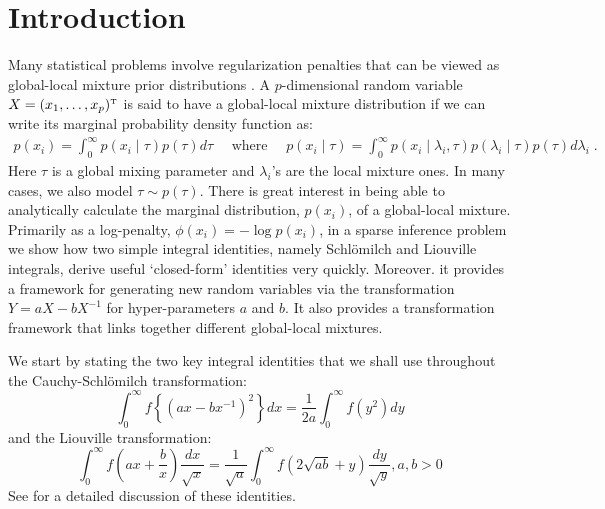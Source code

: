 \documentclass[letterpaper,11pt]{article}
\begin{document}
\section{Introduction}
Many statistical problems involve regularization penalties that can be viewed as global-local mixture prior distributions \citep{polson2011data, hans2011comment}. A $p$-dimensional random variable $X = (x_1, \ldots, x_p)^{{ \mathrm{\scriptscriptstyle T} }}$ is said to have a global-local mixture distribution if we can write its marginal probability density function as: 
\begin{gather*}
p(x_i) = \int_{0}^{\infty} p(x_i \mid \tau) p(\tau) d\tau \quad \text{ where } \quad
p( x_i \mid \tau) = \int_{0}^{\infty} p(x_i \mid \lambda_i, \tau) p(\lambda_i \mid \tau) p(\tau) d\lambda_i
\;.
\end{gather*}
Here $\tau$ is a global mixing parameter and $\lambda_i$'s are the local mixture ones. In many cases, we also model $\tau \sim p(\tau)$. There is great interest in being able to analytically calculate the marginal distribution, $p(x_i)$, of a global-local mixture. Primarily as a log-penalty, $\phi(x_i) = -\log p(x_i)$, in a sparse inference problem we show how two simple integral identities, namely Schl\"omilch and Liouville integrals, derive useful `closed-form' identities very quickly. Moreover. it provides a framework for generating new random variables via the transformation $Y = a X - b X^{-1}$ for hyper-parameters $a$ and $b$. It also provides a transformation framework that links together different global-local mixtures. 

We start by stating the two key integral identities that we shall use throughout the Cauchy-Schl\"omilch transformation: 
\begin{equation}
\int_0^\infty f \left\{ ( a x - b x^{-1} )^2 \right\} d x = \frac{1}{2a} \int_0^\infty f(y^2) d y \label{eq:identity}
\end{equation}
and the Liouville transformation:
\begin{equation}
\int_{0}^{\infty} f\left(ax + \frac{b}{x} \right) \frac{dx}{\sqrt{x}} = \frac{1}{\sqrt{a}} \int_{0}^{\infty} f \left( 2\sqrt{ab} + y \right) \frac{dy}{\sqrt{y}}, a,b >0 \label{eq:liouville}
\end{equation}
See \cite{boros2006irresistible,baker2008probabilistic,amdeberhan2010cauchy,jones2014generating} for a detailed discussion of these identities. 
\end{document}
